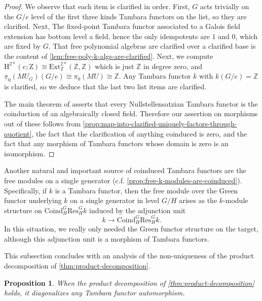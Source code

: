 \documentclass[11pt,dvipsnames]{amsart}
\newcommand{\Z}{\mathbb{Z}}
\newtheorem{proposition}[theorem]{Proposition}
\theoremstyle{BoldRemark}
\begin{document}
\begin{proof}
	We observe that each item is clarified in order. First, $G$ acts trivially on the $G/e$ level of the first three kinds Tambara functors on the list, so they are clarified. Next, The fixed-point Tambara functor associated to a Galois field extension has bottom level a field, hence the only idempotents are $1$ and $0$, which are fixed by $G$. That free polynomial algebras are clarified over a clarified base is the content of \cref{lem:free-poly-k-algs-are-clarified}. Next, we compute $\mathrm{H}^{2*}(e;\mathrm{Z}) \cong \mathrm{Ext}_{\Z}^{2*}(\Z,\Z)$ which is just $\Z$ in degree zero, and $\underline{\pi}_0(MU_G)(G/e) \cong \pi_0(MU) \cong \Z$. Any Tambara functor $k$ with $k(G/e) = \Z$ is clarified, so we deduce that the last two list items are clarified.
	
	The main theorem of \cite{SSW24} asserts that every Nullstellensatzian Tambara functor is the coinduction of an algebraically closed field. Therefore our assertion on morphisms out of these follows from \cref{prop:map-into-clarified-uniquely-factors-through-quotient}, the fact that the clarification of anything coinduced is zero, and the fact that any morphism of Tambara functors whose domain is zero is an isomorphism.
\end{proof}

Another natural and important source of coinduced Tambara functors are the free modules on a single generator (c.f. \cref{prop:free-k-modules-are-coinduced}). Specifically, if $k$ is a Tambara functor, then the free module over the Green functor underlying $k$ on a single generator in level $G/H$ arises as the $k$-module structure on $\mathrm{Coind}_H^G \mathrm{Res}_H^G k$ induced by the adjunction unit 
\[ 
	k \rightarrow \mathrm{Coind}_H^G \mathrm{Res}_H^G k .
\]
In this situation, we really only needed the Green functor structure on the target, although this adjunction unit is a morphism of Tambara functors.

This subsection concludes with an analysis of the non-uniqueness of the product decomposition of \cref{thm:product-decomposition}.

\begin{proposition}\label{prop:product-thm-diagonalizes}
	When the product decomposition of \cref{thm:product-decomposition} holds, it diagonalizes any Tambara functor automorphism.
\end{proposition}
\end{document}
